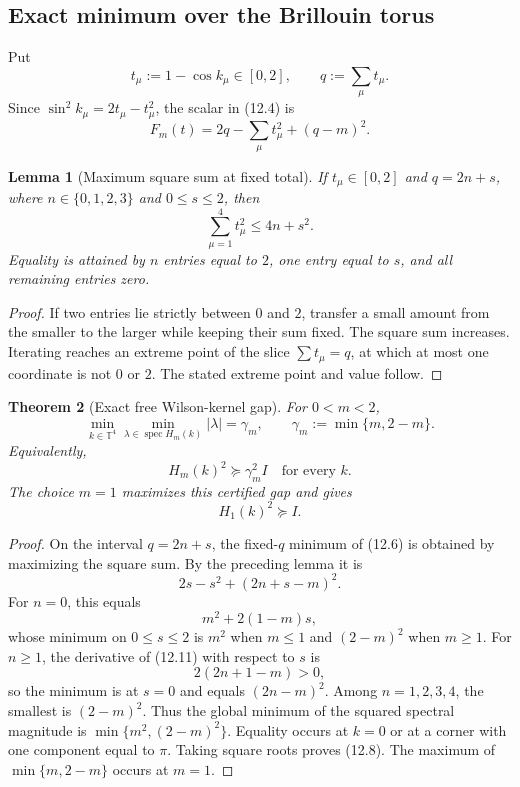 \documentclass[11pt]{article}
\newtheorem{theorem}{Theorem}[section]
\newtheorem{lemma}[theorem]{Lemma}
\newcommand{\spec}{\operatorname{spec}}
\begin{document}
\subsection{Exact minimum over the Brillouin torus}

Put
\[
 t_\mu:=1-\cos k_\mu\in[0,2],
 \qquad q:=\sum_\mu t_\mu.
 \tag{12.5}
\]
Since \(\sin^2k_\mu=2t_\mu-t_\mu^2\), the scalar in (12.4) is
\[
 F_m(t)=2q-\sum_\mu t_\mu^2+(q-m)^2.
 \tag{12.6}
\]

\begin{lemma}[Maximum square sum at fixed total]
\label{lem:v11v12-square-sum}
If \(t_\mu\in[0,2]\) and \(q=2n+s\), where
\(n\in\{0,1,2,3\}\) and \(0\leq s\leq2\), then
\[
 \sum_{\mu=1}^4t_\mu^2\leq4n+s^2.
 \tag{12.7}
\]
Equality is attained by \(n\) entries equal to \(2\), one entry equal to
\(s\), and all remaining entries zero.
\end{lemma}

\begin{proof}
If two entries lie strictly between \(0\) and \(2\), transfer a small
amount from the smaller to the larger while keeping their sum fixed.
The square sum increases.  Iterating reaches an extreme point of the
slice \(\sum t_\mu=q\), at which at most one coordinate is not \(0\) or
\(2\).  The stated extreme point and value follow.
\end{proof}

\begin{theorem}[Exact free Wilson-kernel gap]
\label{thm:v11v12-free-gap}
For \(0<m<2\),
\[
 \min_{k\in\mathbb T^4}
 \min_{\lambda\in\spec H_m(k)}|\lambda|
 =
 \gamma_m,
 \qquad
 \gamma_m:=\min\{m,2-m\}.
 \tag{12.8}
\]
Equivalently,
\[
 H_m(k)^2\succeq\gamma_m^2I
 \quad\text{for every }k.
 \tag{12.9}
\]
The choice \(m=1\) maximizes this certified gap and gives
\[
 H_1(k)^2\succeq I.
 \tag{12.10}
\]
\end{theorem}

\begin{proof}
On the interval \(q=2n+s\), the fixed-\(q\) minimum of (12.6) is obtained
by maximizing the square sum.  By the preceding lemma it is
\[
 2s-s^2+(2n+s-m)^2.
 \tag{12.11}
\]
For \(n=0\), this equals
\[
 m^2+2(1-m)s,
 \tag{12.12}
\]
whose minimum on \(0\leq s\leq2\) is \(m^2\) when \(m\leq1\) and
\((2-m)^2\) when \(m\geq1\).  For \(n\geq1\), the derivative of
(12.11) with respect to \(s\) is
\[
 2(2n+1-m)>0,
\]
so the minimum is at \(s=0\) and equals \((2n-m)^2\).  Among
\(n=1,2,3,4\), the smallest is \((2-m)^2\).  Thus the global minimum of
the squared spectral magnitude is
\(\min\{m^2,(2-m)^2\}\).  Equality occurs at \(k=0\) or at a corner with
one component equal to \(\pi\).  Taking square roots proves (12.8).
The maximum of \(\min\{m,2-m\}\) occurs at \(m=1\).
\end{proof}
\end{document}
